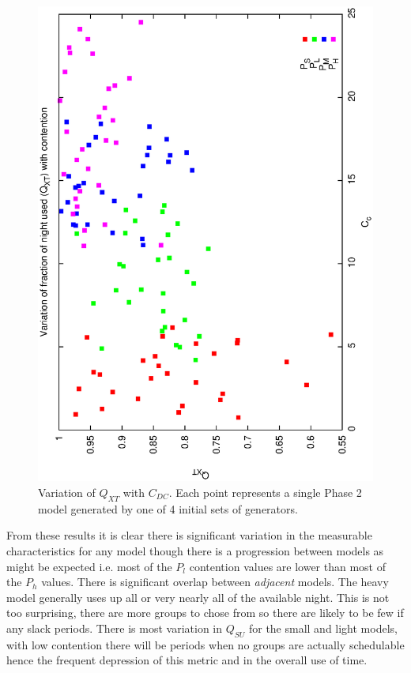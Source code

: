 \begin{figure}[h]

\begin{center}
 \includegraphics[scale=0.5, angle=-90]{figures/p2_gen_qxt.eps}
 \caption[Variation of $Q_{XT}$ with $C_{DC}$ for variable phase2 generator models.] 
   {Variation of $Q_{XT}$ with $C_{DC}$. Each point represents a single Phase 2 model generated by one of 4 initial sets of generators.}
\label{fig:p2_gen_xt}
\end{center} 
\end{figure}

From these results it is clear there is significant variation in the measurable characteristics for any model though there is a progression between models as might be expected i.e. most of the $P_l$ contention values are lower than most of the $P_h$ values. There is significant overlap between \emph{adjacent} models. The heavy model generally uses up all or very nearly all of the available night. This is not too surprising, there are more groups to chose from so there are likely to be few if any slack periods. There is most variation in $Q_{SU}$ for the small and light models, with low contention there will be periods when no groups are actually schedulable hence the frequent depression of this metric and in the overall use of time.


